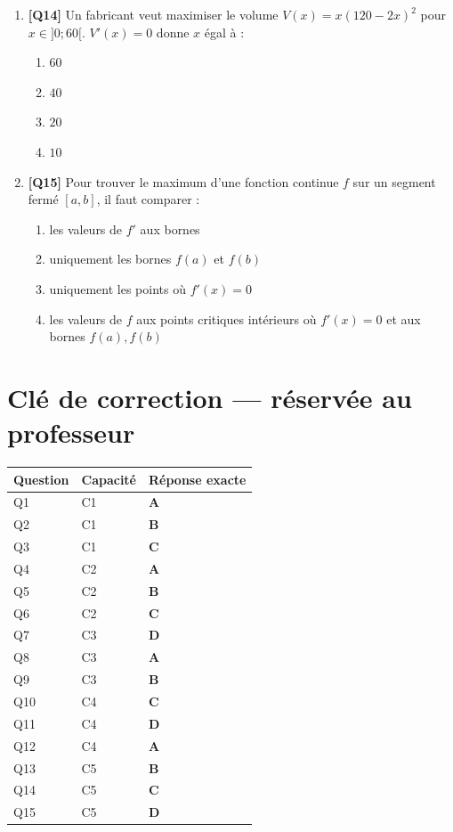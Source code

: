 \begin{enumerate}
\item \textbf{[Q14]} Un fabricant veut maximiser le volume $V(x) = x(120 - 2x)^2$ pour $x \in ]0 ; 60[$. $V'(x) = 0$ donne $x$ égal à :
  \begin{enumerate}[label=\Alph*.]
    \item $60$
    \item $40$
    \item $20$
    \item $10$
  \end{enumerate}

\item \textbf{[Q15]} Pour trouver le maximum d'une fonction continue $f$ sur un segment fermé $[a, b]$, il faut comparer :
  \begin{enumerate}[label=\Alph*.]
    \item les valeurs de $f'$ aux bornes
    \item uniquement les bornes $f(a)$ et $f(b)$
    \item uniquement les points où $f'(x)=0$
    \item les valeurs de $f$ aux points critiques intérieurs où $f'(x)=0$ et aux bornes $f(a), f(b)$
  \end{enumerate}

\end{enumerate}

\ifnxVersionProfesseur
\clearpage
\section*{Clé de correction — réservée au professeur}

\begin{center}
\begin{tabular}{lll}
\hline
Question & Capacité & Réponse exacte \\
\hline
Q1 & C1 & \textbf{A} \\
Q2 & C1 & \textbf{B} \\
Q3 & C1 & \textbf{C} \\
Q4 & C2 & \textbf{A} \\
Q5 & C2 & \textbf{B} \\
Q6 & C2 & \textbf{C} \\
Q7 & C3 & \textbf{D} \\
Q8 & C3 & \textbf{A} \\
Q9 & C3 & \textbf{B} \\
Q10 & C4 & \textbf{C} \\
Q11 & C4 & \textbf{D} \\
Q12 & C4 & \textbf{A} \\
Q13 & C5 & \textbf{B} \\
Q14 & C5 & \textbf{C} \\
Q15 & C5 & \textbf{D} \\
\hline
\end{tabular}
\end{center}

